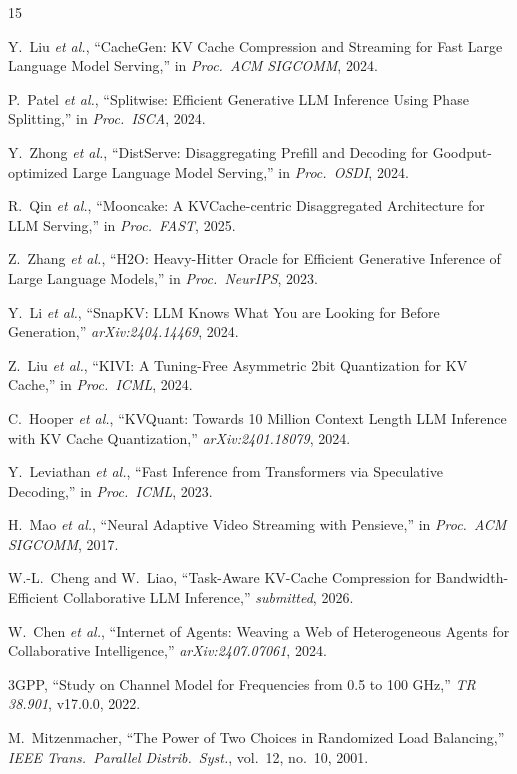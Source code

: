 \documentclass[conference]{IEEEtran}
\newcommand{\etal}{\textit{et al.}\xspace}
\begin{document}

\begin{thebibliography}{15}

Y.~Liu \etal, ``CacheGen: KV Cache Compression and Streaming for Fast Large Language Model Serving,'' in \emph{Proc.\ ACM SIGCOMM}, 2024.

P.~Patel \etal, ``Splitwise: Efficient Generative LLM Inference Using Phase Splitting,'' in \emph{Proc.\ ISCA}, 2024.

Y.~Zhong \etal, ``DistServe: Disaggregating Prefill and Decoding for Goodput-optimized Large Language Model Serving,'' in \emph{Proc.\ OSDI}, 2024.

R.~Qin \etal, ``Mooncake: A KVCache-centric Disaggregated Architecture for LLM Serving,'' in \emph{Proc.\ FAST}, 2025.

Z.~Zhang \etal, ``H2O: Heavy-Hitter Oracle for Efficient Generative Inference of Large Language Models,'' in \emph{Proc.\ NeurIPS}, 2023.

Y.~Li \etal, ``SnapKV: LLM Knows What You are Looking for Before Generation,'' \emph{arXiv:2404.14469}, 2024.

Z.~Liu \etal, ``KIVI: A Tuning-Free Asymmetric 2bit Quantization for KV Cache,'' in \emph{Proc.\ ICML}, 2024.

C.~Hooper \etal, ``KVQuant: Towards 10 Million Context Length LLM Inference with KV Cache Quantization,'' \emph{arXiv:2401.18079}, 2024.

Y.~Leviathan \etal, ``Fast Inference from Transformers via Speculative Decoding,'' in \emph{Proc.\ ICML}, 2023.

H.~Mao \etal, ``Neural Adaptive Video Streaming with Pensieve,'' in \emph{Proc.\ ACM SIGCOMM}, 2017.

W.-L.~Cheng and W.~Liao, ``Task-Aware KV-Cache Compression for Bandwidth-Efficient Collaborative LLM Inference,'' \emph{submitted}, 2026.

W.~Chen \etal, ``Internet of Agents: Weaving a Web of Heterogeneous Agents for Collaborative Intelligence,'' \emph{arXiv:2407.07061}, 2024.

3GPP, ``Study on Channel Model for Frequencies from 0.5 to 100 GHz,'' \emph{TR 38.901}, v17.0.0, 2022.

M.~Mitzenmacher, ``The Power of Two Choices in Randomized Load Balancing,'' \emph{IEEE Trans.\ Parallel Distrib.\ Syst.}, vol.~12, no.~10, 2001.

\end{thebibliography}
\end{document}
